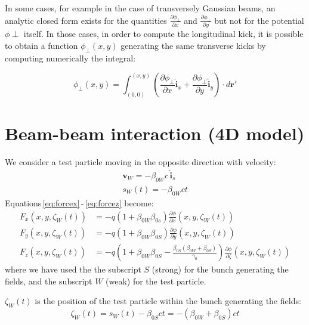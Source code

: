 In some cases, for example in the case of transversely Gaussian beams, an analytic closed form exists for the quantities $\frac{\partial \phi_\perp}{\partial x}$ and $\frac{\partial \phi_\perp}{\partial y}$ but not for the potential $\phi \perp$ itself. In those cases, in order to compute the longitudinal kick, it is possible to obtain a function $\phi_\perp (x,y)$ generating the same transverse kicks by computing numerically the integral:

\begin{equation}
\phi_\perp (x,y) = \int_{(0, 0)}^{(x, y)} 
\left(
\frac{\partial \phi_\perp}{\partial x} \mathbf{\hat{i}}_x
+
\frac{\partial \phi_\perp}{\partial y} \mathbf{\hat{i}}_y
\right)
\cdot
d\mathbf{r'}
\end{equation}



\section{Beam-beam interaction (4D model)}

We consider a test particle moving in the opposite direction with velocity:
\begin{align}
\textbf{v}_W = -\beta_{0W} c\, \hat{\textbf{i}}_s\\
s_W(t) = -\beta_{0W} ct
\end{align}
Equations\,\eqref{eq:forcex}\,-\,\eqref{eq:forcez} become:
\begin{align}
F_x(x, y, \zeta_W(t)) &=  -q(1+\beta_{0W}  \beta_{0s}) \frac{\partial \phi}{\partial x}(x, y, \zeta_W(t)) \label{eq:bbfgenx}\\
F_y(x, y, \zeta_W(t)) &=  -q(1+\beta_{0W}  \beta_{0S}) \frac{\partial \phi}{\partial y}(x, y, \zeta_W(t))\label{eq:bbfgeny}\\
F_z(x, y, \zeta_W(t)) &=  -q\left(1+\beta_{0W}  \beta_{0S} -\frac{\beta_{0S}(\beta_{0W}+\beta_{0S})}{\gamma_0}\right) \frac{\partial \phi}{\partial \zeta}(x, y, \zeta_W(t))\label{eq:bbfgenz}
\end{align}
where we have used the the subscript $S$ (strong) for the bunch generating the fields, and the subscript $W$ (weak) for the test particle. 

$\zeta_W(t)$ is the position of the test particle within the bunch generating the fields: 
\begin{equation}
\zeta_W(t)= s_W(t) -\beta_{0S} c t  = -(\beta_{0W}+\beta_{0S})ct
\label{eq:zetaw}
\end{equation}

